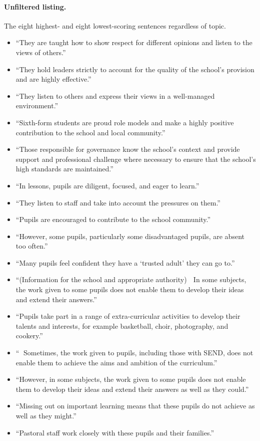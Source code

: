 \paragraph{Unfiltered listing.} The eight highest- and eight lowest-scoring sentences regardless of topic.
\begin{itemize}
  \item ``They are taught how to show respect for different opinions and listen to the views of others.''
  \item ``They hold leaders strictly to account for the quality of the school's provision and are highly effective.''
  \item ``They listen to others and express their views in a well-managed environment.''
  \item ``Sixth-form students are proud role models and make a highly positive contribution to the school and local community.''
  \item ``Those responsible for governance know the school's context and provide support and professional challenge where necessary to ensure that the school's high standards are maintained.''
  \item ``In lessons, pupils are diligent, focused, and eager to learn.''
  \item ``They listen to staff and take into account the pressures on them.''
  \item ``Pupils are encouraged to contribute to the school community.''
\end{itemize}
\begin{itemize}
  \item ``However, some pupils, particularly some disadvantaged pupils, are absent too often.''
  \item ``Many pupils feel confident they have a `trusted adult' they can go to.''
  \item ``(Information for the school and appropriate authority)  In some subjects, the work given to some pupils does not enable them to develop their ideas and extend their answers.''
  \item ``Pupils take part in a range of extra-curricular activities to develop their talents and interests, for example basketball, choir, photography, and cookery.''
  \item `` Sometimes, the work given to pupils, including those with SEND, does not enable them to achieve the aims and ambition of the curriculum.''
  \item ``However, in some subjects, the work given to some pupils does not enable them to develop their ideas and extend their answers as well as they could.''
  \item ``Missing out on important learning means that these pupils do not achieve as well as they might.''
  \item ``Pastoral staff work closely with these pupils and their families.''
\end{itemize}
